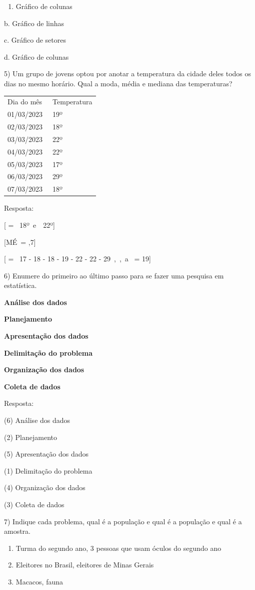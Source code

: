 \begin{enumerate}
\def\labelenumi{\alph{enumi}.}
\tightlist
\item
  Gráfico de colunas
\end{enumerate}

b. Gráfico de linhas

c. Gráfico de setores

d. Gráfico de colunas

5) Um grupo de jovens optou por anotar a temperatura da cidade deles
todos os dias no mesmo horário. Qual a moda, média e mediana das
temperaturas?

\begin{longtable}[]{@{}ll@{}}
\toprule
\endhead
Dia do mês~ & Temperatura\tabularnewline
01/03/2023 & 19º\tabularnewline
02/03/2023 & 18º\tabularnewline
03/03/2023 & 22º\tabularnewline
04/03/2023 & 22º\tabularnewline
05/03/2023 & 17º\tabularnewline
06/03/2023 & 29º\tabularnewline
07/03/2023 & 18º\tabularnewline
\bottomrule
\end{longtable}

Resposta:

[ = \ 18º\ e\ \ 22º]

[MÉ\  =  ,7]

[ = \ 17 - 18 - 18 - 19 - 22 - 22 - 29\ ,\ ,\ a\  = 19]

6) Enumere do primeiro ao último passo para se fazer uma pesquisa em
estatística.

\textbf{Análise dos dados}

\textbf{Planejamento}

\textbf{Apresentação dos dados}

\textbf{Delimitação do problema}

\textbf{Organização dos dados}

\textbf{Coleta de dados}

Resposta:

(6) Análise dos dados

(2) Planejamento

(5) Apresentação dos dados

(1) Delimitação do problema

(4) Organização dos dados

(3) Coleta de dados

7) Indique cada problema, qual é a população e qual é a população e qual
é a amostra.

\begin{enumerate}
\def\labelenumi{\alph{enumi})}
\item
  Turma do segundo ano, 3 pessoas que usam óculos do segundo ano
\item
  Eleitores no Brasil, eleitores de Minas Gerais
\item
  Macacos, fauna
\end{enumerate}

